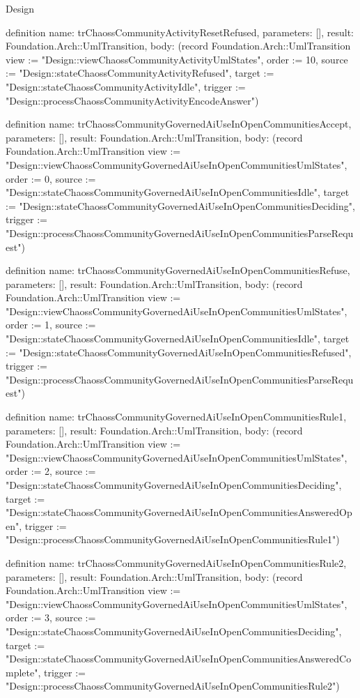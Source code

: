 \begin{lexlean}{Design}
\begin{semanticmodule}
definition{
  name: trChaossCommunityActivityResetRefused,
  parameters: [],
  result: Foundation.Arch::UmlTransition,
  body: (record Foundation.Arch::UmlTransition {view := "Design::viewChaossCommunityActivityUmlStates", order := 10, source := "Design::stateChaossCommunityActivityRefused", target := "Design::stateChaossCommunityActivityIdle", trigger := "Design::processChaossCommunityActivityEncodeAnswer"})
}

definition{
  name: trChaossCommunityGovernedAiUseInOpenCommunitiesAccept,
  parameters: [],
  result: Foundation.Arch::UmlTransition,
  body: (record Foundation.Arch::UmlTransition {view := "Design::viewChaossCommunityGovernedAiUseInOpenCommunitiesUmlStates", order := 0, source := "Design::stateChaossCommunityGovernedAiUseInOpenCommunitiesIdle", target := "Design::stateChaossCommunityGovernedAiUseInOpenCommunitiesDeciding", trigger := "Design::processChaossCommunityGovernedAiUseInOpenCommunitiesParseRequest"})
}

definition{
  name: trChaossCommunityGovernedAiUseInOpenCommunitiesRefuse,
  parameters: [],
  result: Foundation.Arch::UmlTransition,
  body: (record Foundation.Arch::UmlTransition {view := "Design::viewChaossCommunityGovernedAiUseInOpenCommunitiesUmlStates", order := 1, source := "Design::stateChaossCommunityGovernedAiUseInOpenCommunitiesIdle", target := "Design::stateChaossCommunityGovernedAiUseInOpenCommunitiesRefused", trigger := "Design::processChaossCommunityGovernedAiUseInOpenCommunitiesParseRequest"})
}

definition{
  name: trChaossCommunityGovernedAiUseInOpenCommunitiesRule1,
  parameters: [],
  result: Foundation.Arch::UmlTransition,
  body: (record Foundation.Arch::UmlTransition {view := "Design::viewChaossCommunityGovernedAiUseInOpenCommunitiesUmlStates", order := 2, source := "Design::stateChaossCommunityGovernedAiUseInOpenCommunitiesDeciding", target := "Design::stateChaossCommunityGovernedAiUseInOpenCommunitiesAnsweredOpen", trigger := "Design::processChaossCommunityGovernedAiUseInOpenCommunitiesRule1"})
}

definition{
  name: trChaossCommunityGovernedAiUseInOpenCommunitiesRule2,
  parameters: [],
  result: Foundation.Arch::UmlTransition,
  body: (record Foundation.Arch::UmlTransition {view := "Design::viewChaossCommunityGovernedAiUseInOpenCommunitiesUmlStates", order := 3, source := "Design::stateChaossCommunityGovernedAiUseInOpenCommunitiesDeciding", target := "Design::stateChaossCommunityGovernedAiUseInOpenCommunitiesAnsweredComplete", trigger := "Design::processChaossCommunityGovernedAiUseInOpenCommunitiesRule2"})
}


\end{semanticmodule}
\end{lexlean}
